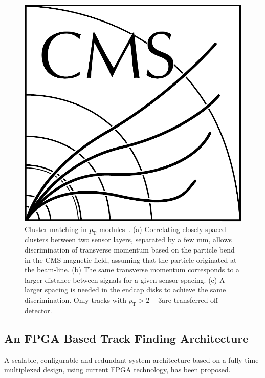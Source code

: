 \begin{figure}[!h]
\centering
\includegraphics[width=5in]{CMS-bw-logo.pdf}
\caption{Cluster matching in $p_\mathrm{T}$-modules~\cite{P2TrackerTDR}. (a) Correlating closely spaced clusters between two sensor layers, separated by a few mm, allows discrimination of transverse momentum based on the particle bend in the CMS magnetic field, assuming that the particle originated at the beam-line. (b) The same transverse momentum corresponds to a larger distance between signals for a given sensor spacing. (c) A larger spacing is needed in the endcap disks to achieve the same discrimination. Only tracks with $p_{\mathrm{T}}>2-3$\GeVc are transferred off-detector.
}
\label{stubs}
\end{figure}

\subsection{An FPGA Based Track Finding Architecture}

A scalable, configurable and redundant system architecture based on a fully time-multiplexed design, using current FPGA technology, has been proposed.